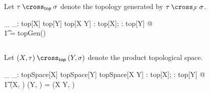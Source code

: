 \documentclass[11pt, oneside]{article}
\begin{document}
Let $\tau \prodTop \sigma$ denote the topology generated by $\tau \prodFam \sigma$.

\begin{gendef}[X,Y]
	\_ \prodTop \_: top[X] \cross top[Y] \fun top[X \cross Y]
\where
	\forall \tau: top[X]; \sigma: top[Y] @ \\
	\t1	\tau \prodTop \sigma = topGen(\tau \prodFam \sigma)
\end{gendef}

\subsection{}

Let $(X, \tau) \prodTop (Y, \sigma)$ denote the product topological space.

\begin{gendef}[X,Y]
	\_ \prodTopSp \_: topSpace[X] \cross topSpace[Y] \fun topSpace[X \cross Y]
\where
	\forall \tau: top[X]; \sigma: top[Y] @ \\
	\t1	(X, \tau) \prodTopSp (Y, \sigma) = (X \cross Y, \tau \prodTop \sigma)
\end{gendef}

\printbibliography
\end{document}
